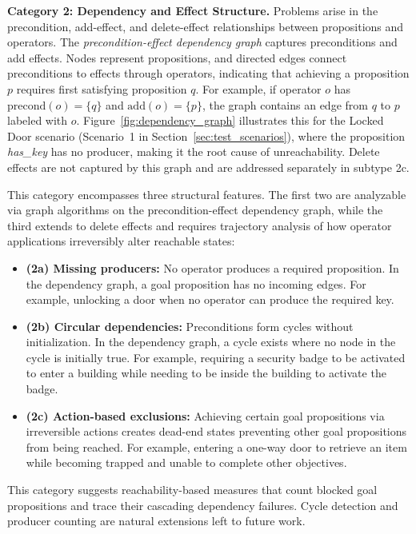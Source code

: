 \textbf{Category 2: Dependency and Effect Structure.} Problems arise in the precondition, add-effect, and delete-effect relationships between propositions and operators. The \emph{precondition-effect dependency graph} captures preconditions and add effects. Nodes represent propositions, and directed edges connect preconditions to effects through operators, indicating that achieving a proposition $p$ requires first satisfying proposition $q$. For example, if operator $o$ has $\text{precond}(o) = \{q\}$ and $\text{add}(o) = \{p\}$, the graph contains an edge from $q$ to $p$ labeled with $o$. Figure~\ref{fig:dependency_graph} illustrates this for the Locked Door scenario (Scenario~1 in Section~\ref{sec:test_scenarios}), where the proposition \textit{has\_key} has no producer, making it the root cause of unreachability. Delete effects are not captured by this graph and are addressed separately in subtype 2c.



This category encompasses three structural features. The first two are analyzable via graph algorithms on the precondition-effect dependency graph, while the third extends to delete effects and requires trajectory analysis of how operator applications irreversibly alter reachable states:
\begin{itemize}
    \item \textbf{(2a) Missing producers:} No operator produces a required proposition. In the dependency graph, a goal proposition has no incoming edges. For example, unlocking a door when no operator can produce the required key.
    \item \textbf{(2b) Circular dependencies:} Preconditions form cycles without initialization. In the dependency graph, a cycle exists where no node in the cycle is initially true. For example, requiring a security badge to be activated to enter a building while needing to be inside the building to activate the badge.
    \item \textbf{(2c) Action-based exclusions:} Achieving certain goal propositions via irreversible actions creates dead-end states preventing other goal propositions from being reached. For example, entering a one-way door to retrieve an item while becoming trapped and unable to complete other objectives.
\end{itemize}
This category suggests reachability-based measures that count blocked goal propositions and trace their cascading dependency failures. Cycle detection and producer counting are natural extensions left to future work.

